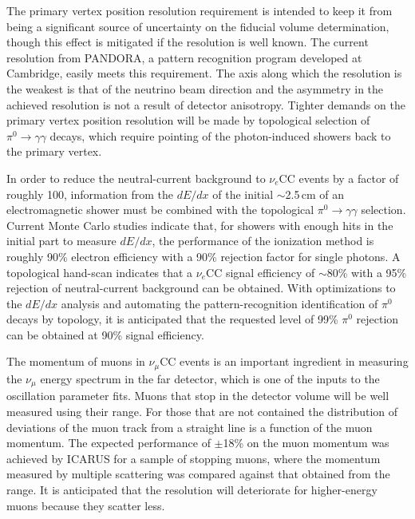 The primary vertex position resolution requirement is intended 
to keep it from being a significant source of uncertainty on the
fiducial volume determination, though this effect is mitigated if the
resolution is well known.  The current resolution from PANDORA, 
a pattern recognition program developed at Cambridge, easily
meets this requirement.  The axis along which the resolution is the
weakest is that of the neutrino beam direction and the asymmetry in the
achieved resolution is not a result of detector anisotropy.   Tighter
demands on the primary vertex position resolution will be made by
topological selection of $\pi^0\rightarrow\gamma\gamma$ decays, which
require pointing of the photon-induced showers back to the primary
vertex.

In order to reduce the neutral-current background to $\nu_e$CC events
by a factor of roughly 100, information from the $dE/dx$ of the
initial $\sim$2.5\,cm of an electromagnetic shower must be combined
with the topological $\pi^0\rightarrow\gamma\gamma$
selection\cite{docdb-6954}.  Current Monte Carlo studies indicate
that, for showers with enough hits in the initial part to measure
$dE/dx$, the performance of the ionization method is roughly 90\%
electron efficiency with a 90\% rejection factor for single photons.
A topological hand-scan indicates that a $\nu_e$CC signal
efficiency of $\sim$80\% with a 95\% rejection of neutral-current
background can be obtained.  With optimizations to the $dE/dx$
analysis and automating the pattern-recognition identification of
$\pi^0$ decays by topology, it is anticipated that the requested level
of 99\% $\pi^0$ rejection can be obtained at 90\% signal efficiency.

The momentum of muons in $\nu_\mu$CC events is an important ingredient
in measuring the $\nu_\mu$ energy spectrum in the far detector, which
is one of the inputs to the oscillation parameter fits.  Muons that
stop in the detector volume will be well measured using their range.
For those that are not contained the distribution of deviations of the
muon track from a straight line is a function of the muon momentum.
The expected performance of $\pm$18\% on the muon momentum was
achieved by ICARUS for a sample of stopping muons, where the momentum
measured by multiple scattering was compared against that obtained
from the range.  It is anticipated that the resolution will
deteriorate for higher-energy muons because they scatter less.

